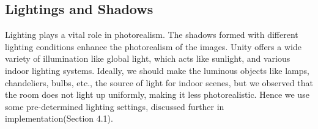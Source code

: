 \subsection{Lightings and Shadows}\label{subsec:lightings-and-shadows}

Lighting plays a vital role in photorealism.
The shadows formed with different lighting conditions enhance the photorealism of the images.
Unity offers a wide variety of illumination like global light, which acts like sunlight, and various indoor lighting systems.
Ideally, we should make the luminous objects like lamps, chandeliers, bulbs, etc.,
the source of light for indoor scenes, but we observed that the room does not light up uniformly, making it less photorealistic.
Hence we use some pre-determined lighting settings, discussed further in implementation(Section 4.1).


